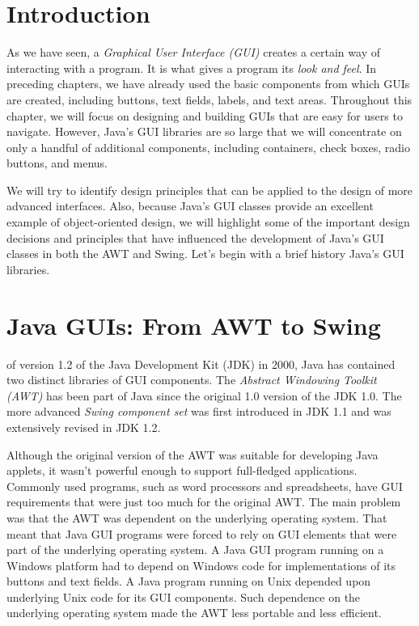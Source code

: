 \section{Introduction}
\noindent As we have seen, a {\it Graphical User Interface (GUI)}
creates a certain way of interacting with a program.  It is what gives
a program its {\it look and feel}. In preceding chapters, we have
already used the basic components from which GUIs are created,
including buttons, text fields, labels, and text areas.  Throughout
this chapter, we will focus on designing and building GUIs that are
easy for users to navigate.  However, Java's GUI libraries are so
large that we will concentrate on only a handful of additional
components, including containers, check boxes, radio buttons, and
menus.

We will try to identify design principles that can be applied to the
design of more advanced interfaces.  Also, because Java's GUI classes
provide an excellent example of object-oriented design, we will
highlight some of the important design decisions and principles that
have influenced the development of Java's GUI classes in both the AWT
and Swing.  Let's begin with a brief history Java's GUI libraries.

\section{Java GUIs: From AWT to Swing}
\WWWjava
 of version 1.2 of the Java
Development Kit (JDK) in 2000, Java has contained two distinct
libraries of GUI components.  The {\it Abstract Windowing Toolkit
(AWT)} has been part of Java since the original 1.0 version of the JDK
1.0.  The more advanced {\em Swing component set} was first introduced
in JDK 1.1 and was extensively revised in JDK 1.2.

Although the original version of the AWT was suitable for developing
Java applets, it wasn't powerful enough to support full-fledged
applications. Commonly used programs, such as word processors and
spreadsheets, have GUI requirements that were just too much for the
original AWT.  The main problem was that the AWT was dependent on the
underlying operating system. That meant that Java GUI programs were
forced to rely on GUI elements that were part of the underlying
operating system. A Java GUI program running on a Windows platform had
to depend on Windows code for implementations of its buttons and text
fields.  A Java program running on Unix depended upon underlying Unix
code for its GUI components. Such dependence on the underlying
operating system made the AWT less portable and less efficient.

